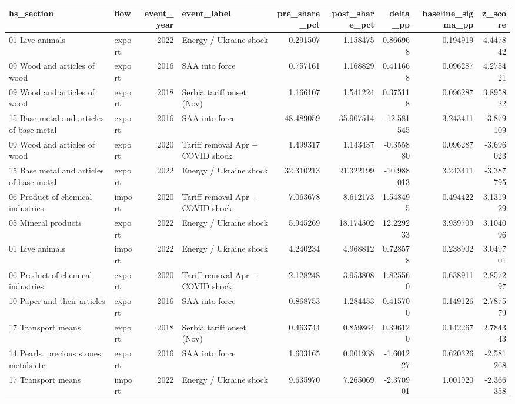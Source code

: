 \begin{tabular}{llrlrrrrr}
\toprule
hs_section & flow & event_year & event_label & pre_share_pct & post_share_pct & delta_pp & baseline_sigma_pp & z_score \\
\midrule
01 Live animals & export & 2022 & Energy / Ukraine shock & 0.291507 & 1.158475 & 0.866968 & 0.194919 & 4.447842 \\
09 Wood and articles of wood & export & 2016 & SAA into force & 0.757161 & 1.168829 & 0.411668 & 0.096287 & 4.275421 \\
09 Wood and articles of wood & export & 2018 & Serbia tariff onset (Nov) & 1.166107 & 1.541224 & 0.375118 & 0.096287 & 3.895822 \\
15 Base metal and articles of base metal & export & 2016 & SAA into force & 48.489059 & 35.907514 & -12.581545 & 3.243411 & -3.879109 \\
09 Wood and articles of wood & export & 2020 & Tariff removal Apr + COVID shock & 1.499317 & 1.143437 & -0.355880 & 0.096287 & -3.696023 \\
15 Base metal and articles of base metal & export & 2022 & Energy / Ukraine shock & 32.310213 & 21.322199 & -10.988013 & 3.243411 & -3.387795 \\
06 Product of chemical industries & import & 2020 & Tariff removal Apr + COVID shock & 7.063678 & 8.612173 & 1.548495 & 0.494422 & 3.131929 \\
05 Mineral products & export & 2022 & Energy / Ukraine shock & 5.945269 & 18.174502 & 12.229233 & 3.939709 & 3.104096 \\
01 Live animals & import & 2022 & Energy / Ukraine shock & 4.240234 & 4.968812 & 0.728578 & 0.238902 & 3.049701 \\
06 Product of chemical industries & export & 2020 & Tariff removal Apr + COVID shock & 2.128248 & 3.953808 & 1.825560 & 0.638911 & 2.857297 \\
10 Paper and their articles & export & 2016 & SAA into force & 0.868753 & 1.284453 & 0.415700 & 0.149126 & 2.787579 \\
17 Transport means & export & 2018 & Serbia tariff onset (Nov) & 0.463744 & 0.859864 & 0.396120 & 0.142267 & 2.784343 \\
14 Pearls. precious stones. metals etc & export & 2016 & SAA into force & 1.603165 & 0.001938 & -1.601227 & 0.620326 & -2.581268 \\
17 Transport means & import & 2022 & Energy / Ukraine shock & 9.635970 & 7.265069 & -2.370901 & 1.001920 & -2.366358 \\

\end{tabular}
